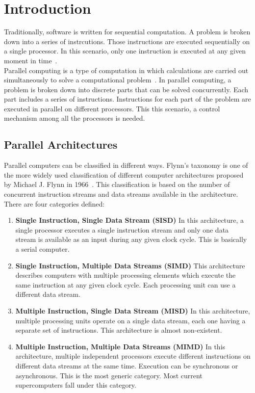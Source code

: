 \chapter{Introduction}
\label{sec:Introduction}

Traditionally, software is written for sequential computation. A problem is broken down into a series of instrcutions. Those instructions are executed sequentially on a single processor. In this scenario, only one instruction is executed at any given moment in time~\cite{barney2010introduction}.\\
Parallel computing is a type of computation in which calculations are carried out simultaneously to solve a computational problem~\cite{Almasi:1989:HPC:160438}. In parallel computing, a problem is broken down into discrete parts that can be solved concurrently. Each part includes a series of instructions. Instructions for each part of the problem are executed in parallel on different processors. This this scenario, a control mechanism among all the processors is needed.


\section{Parallel Architectures}
Parallel computers can be classified in different ways. Flynn's taxonomy is one of the more widely used classification of different computer architectures proposed by Michael J. Flynn in 1966~\cite{5009071,44900}. This classification is based on the number of concurrent instruction streams and data streams available in the architecture.
There are four categories defined:

\begin{enumerate}
\item \textbf{Single Instruction, Single Data Stream (SISD)}
    In this architecture, a single processor executes a single instruction stream and only one data stream is available as an input during any given clock cycle. This is basically a serial computer.
\item \textbf{Single Instruction, Multiple Data Streams (SIMD)}
    This architecture describes computers with multiple processing elements which execute the same instruction at any given clock cycle. Each processing unit can use a different data stream.
\item \textbf{Multiple Instruction, Single Data Stream (MISD)}
    In this architecture, multiple processing units operate on a single data stream, each one having a separate set of instructions. This architecture is almost non-existent.
\item \textbf{Multiple Instruction, Multiple Data Streams (MIMD)}
    In this architecture, multiple independent processors execute different instructions on different data streams at the same time. Execution can be synchronous or asynchronous. This is the most generic category. Most current supercomputers fall under this category.
\end{enumerate}

